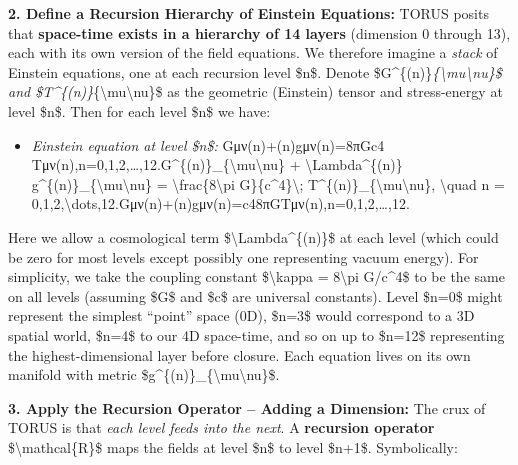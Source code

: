 \documentclass[
]{article}
\begin{document}
\textbf{2. Define a Recursion Hierarchy of Einstein Equations:} TORUS
posits that \textbf{space-time exists in a hierarchy of 14 layers}
(dimension 0 through 13), each with its own version of the field
equations\hspace{0pt}. We therefore imagine a \emph{stack} of Einstein
equations, one at each recursion level \$n\$. Denote
\$G\^{}\{(n)\}\emph{\{\textbackslash mu\textbackslash nu\}\$ and
\$T\^{}\{(n)\}}\{\textbackslash mu\textbackslash nu\}\$ as the geometric
(Einstein) tensor and stress-energy at level \$n\$. Then for each level
\$n\$ we have:

\begin{itemize}
\item
  \emph{Einstein equation at level \$n\$:}
  Gμν(n)+\Lambda(n)gμν(n)=8πGc4  Tμν(n),n=0,1,2,\ldots,12.G\^{}\{(n)\}\_\{\textbackslash mu\textbackslash nu\}
  + \textbackslash Lambda\^{}\{(n)\}
  g\^{}\{(n)\}\_\{\textbackslash mu\textbackslash nu\} =
  \textbackslash frac\{8\textbackslash pi G\}\{c\^{}4\}\textbackslash;
  T\^{}\{(n)\}\_\{\textbackslash mu\textbackslash nu\},
  \textbackslash quad n =
  0,1,2,\textbackslash dots,12.Gμν(n)\hspace{0pt}+\Lambda(n)gμν(n)\hspace{0pt}=c48πG\hspace{0pt}Tμν(n)\hspace{0pt},n=0,1,2,\ldots,12.
\end{itemize}

Here we allow a cosmological term \$\textbackslash Lambda\^{}\{(n)\}\$
at each level (which could be zero for most levels except possibly one
representing vacuum energy). For simplicity, we take the coupling
constant \$\textbackslash kappa = 8\textbackslash pi G/c\^{}4\$ to be
the same on all levels (assuming \$G\$ and \$c\$ are universal
constants)\hspace{0pt}. Level \$n=0\$ might represent the simplest
``point'' space (0D), \$n=3\$ would correspond to a 3D spatial world,
\$n=4\$ to our 4D space-time, and so on up to \$n=12\$ representing the
highest-dimensional layer before closure. Each equation lives on its own
manifold with metric
\$g\^{}\{(n)\}\_\{\textbackslash mu\textbackslash nu\}\$.

\textbf{3. Apply the Recursion Operator -- Adding a Dimension:} The crux
of TORUS is that \emph{each level feeds into the next}. A
\textbf{recursion operator} \$\textbackslash mathcal\{R\}\$ maps the
fields at level \$n\$ to level \$n+1\$. Symbolically\hspace{0pt}:
\end{document}
